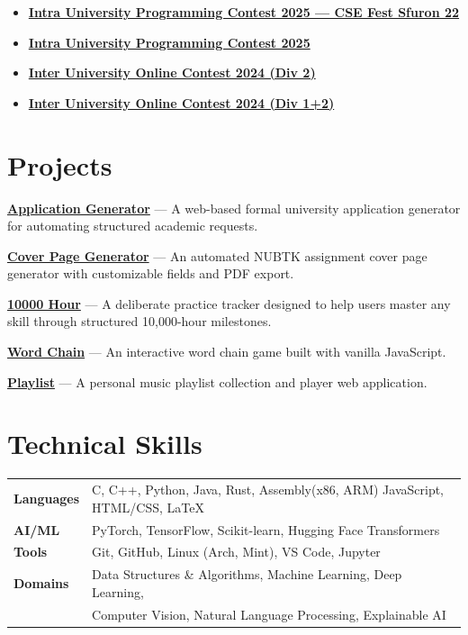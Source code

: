 \documentclass[a4paper,11pt]{article}
\newcommand{\projectentry}[3]{%
  \textbf{\href{#1}{#2}} --- #3 \par\vspace{3pt}
}
\begin{document}
\begin{itemize}[leftmargin=1.2em, itemsep=2pt, parsep=0pt]
  \item \textbf{\href{https://github.com/QKnot/IUPC2025SFURON22-NUBTK.git}{Intra University Programming Contest 2025 --- CSE Fest Sfuron 22}}
  \item \textbf{\href{https://github.com/QKnot/IUPC2025-NUBTK.git}{Intra University Programming Contest 2025}}
  \item \textbf{\href{https://www.hackerrank.com/iccp-div2-001}{Inter University Online Contest 2024 (Div 2)}}
  \item \textbf{\href{https://www.hackerrank.com/iccp-divoneplustwo-001}{Inter University Online Contest 2024 (Div 1+2)}}
\end{itemize}

\section{Projects}

\projectentry
  {https://qknot.github.io/University-Formal-Application-Generator/}
  {Application Generator}
  {A web-based formal university application generator for automating structured academic requests.}

\projectentry
  {https://qknot.github.io/NUBTK-Cover-Page-Generator/}
  {Cover Page Generator}
  {An automated NUBTK assignment cover page generator with customizable fields and PDF export.}

\projectentry
  {https://github.com/QKnot/10000-hour.git}
  {10000 Hour}
  {A deliberate practice tracker designed to help users master any skill through structured 10,000-hour milestones.}

\projectentry
  {https://qknot.github.io/word-chain/}
  {Word Chain}
  {An interactive word chain game built with vanilla JavaScript.}

\projectentry
  {https://qknot.github.io/play-list/}
  {Playlist}
  {A personal music playlist collection and player web application.}

\section{Technical Skills}

\begin{tabularx}{\textwidth}{@{} l X @{}}
  \textbf{Languages}    & C, C++, Python, Java, Rust, Assembly(x86, ARM) JavaScript, HTML/CSS, \LaTeX \\[3pt]
  \textbf{AI/ML}        & PyTorch, TensorFlow, Scikit-learn, Hugging Face Transformers \\[3pt]
  \textbf{Tools}        & Git, GitHub, Linux (Arch, Mint), VS Code, Jupyter \\[3pt]
  \textbf{Domains}      & Data Structures \& Algorithms, Machine Learning, Deep Learning, \\
                        & Computer Vision, Natural Language Processing, Explainable AI \\
\end{tabularx}
\end{document}
